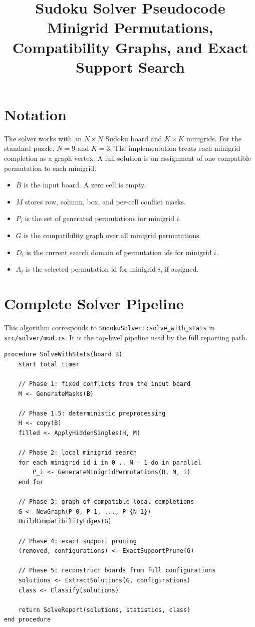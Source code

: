 \documentclass[11pt,a4paper]{article}
\title{\textbf{Sudoku Solver Pseudocode}\\
\large Minigrid Permutations, Compatibility Graphs, and Exact Support Search}
\author{}
\date{}
\begin{document}
\maketitle

\section{Notation}

The solver works with an $N \times N$ Sudoku board and $K \times K$ minigrids. For the standard puzzle, $N = 9$ and $K = 3$. The implementation treats each minigrid completion as a graph vertex. A full solution is an assignment of one compatible permutation to each minigrid.

\begin{itemize}
    \item $B$ is the input board. A zero cell is empty.
    \item $M$ stores row, column, box, and per-cell conflict masks.
    \item $P_i$ is the set of generated permutations for minigrid $i$.
    \item $G$ is the compatibility graph over all minigrid permutations.
    \item $D_i$ is the current search domain of permutation ids for minigrid $i$.
    \item $A_i$ is the selected permutation id for minigrid $i$, if assigned.
\end{itemize}

\section{Complete Solver Pipeline}

This algorithm corresponds to \texttt{SudokuSolver::solve\_with\_stats} in \texttt{src/solver/mod.rs}. It is the top-level pipeline used by the full reporting path.

\begin{lstlisting}[caption={Complete solver pipeline}]
procedure SolveWithStats(board B)
    start total timer

    // Phase 1: fixed conflicts from the input board
    M <- GenerateMasks(B)

    // Phase 1.5: deterministic preprocessing
    H <- copy(B)
    filled <- ApplyHiddenSingles(H, M)

    // Phase 2: local minigrid search
    for each minigrid id i in 0 .. N - 1 do in parallel
        P_i <- GenerateMinigridPermutations(H, M, i)
    end for

    // Phase 3: graph of compatible local completions
    G <- NewGraph(P_0, P_1, ..., P_{N-1})
    BuildCompatibilityEdges(G)

    // Phase 4: exact support pruning
    (removed, configurations) <- ExactSupportPrune(G)

    // Phase 5: reconstruct boards from full configurations
    solutions <- ExtractSolutions(G, configurations)
    class <- Classify(solutions)

    return SolveReport(solutions, statistics, class)
end procedure
\end{lstlisting}
\end{document}
